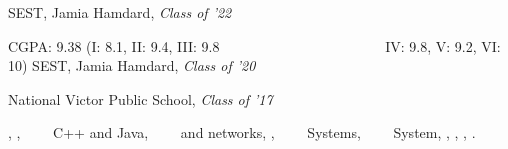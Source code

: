 
SEST, Jamia Hamdard,
\itshape Class of '22

CGPA: 9.38 (I: 8.1, II: 9.4, III: 9.8
\ \ \ \ \ \ \ \ \ \ \ \ \ \ \ \ \ \ \ \ \ \ \  IV: 9.8, V: 9.2, VI: 10)
SEST, Jamia Hamdard,
\itshape Class of '20

National Victor Public School,
\itshape Class of '17


,
, 
\ \ \ \ C++ and Java, 
\ \ \ \ and networks, 
,
\ \ \ \ Systems,
\ \ \ \ System,
,
,
,
.
